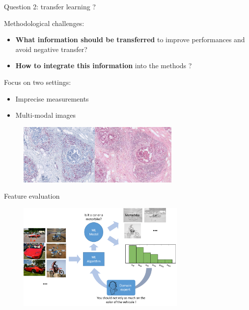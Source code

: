 \documentclass{beamer}
\begin{document}
\begin{frame}{Question 2: transfer learning ?}
	
	Methodological challenges:
	\begin{itemize}
		\item \textbf{What information should be transferred} to improve performances and avoid negative transfer? 
		\item \textbf{How to integrate this information} into the methods ? 
	\end{itemize}
	
	\vfill
	Focus on two settings:
	
	\begin{itemize}
		\item Imprecise measurements 
		\item Multi-modal images
	\end{itemize}

	\begin{figure}
		\center
		\includegraphics[height=113px]{images/multimodal.png}
	\end{figure}	
	
	
\end{frame}


\begin{frame}{Feature evaluation}
	\begin{figure}
		\center
		\includegraphics[height=200px]{images/feature_evaluation.png}
	\end{figure}
\end{frame}
\end{document}
